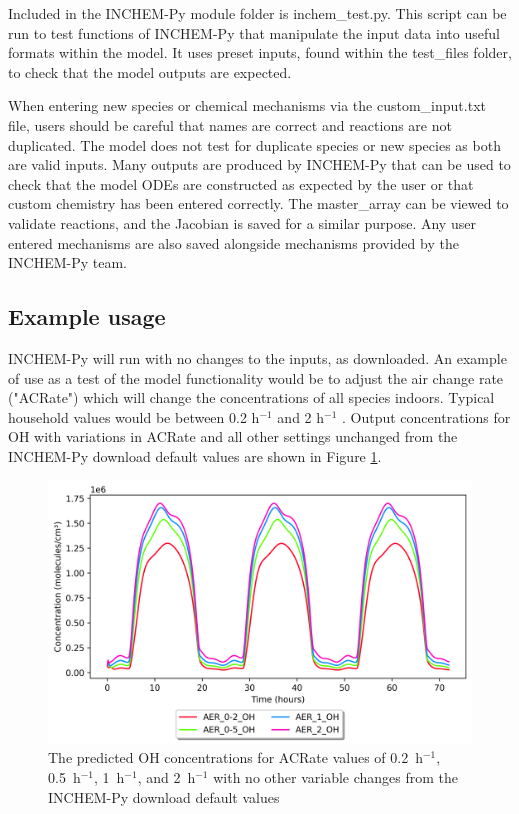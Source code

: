 \documentclass[a4paper]{refart}
\begin{document}
Included in the INCHEM-Py module folder is inchem\_test.py. This script can be run to test functions of INCHEM-Py that manipulate the input data into useful formats within the model. It uses preset inputs, found within the test\_files folder, to check that the model outputs are expected.

When entering new species or chemical mechanisms via the custom\_input.txt file, users should be careful that names are correct and reactions are not duplicated. The model does not test for duplicate species or new species as both are valid inputs. Many outputs are produced by INCHEM-Py that can be used to check that the model ODEs are constructed as expected by the user or that custom chemistry has been entered correctly. The master\_array can be viewed to validate reactions, and the Jacobian is saved for a similar purpose. Any user entered mechanisms are also saved alongside mechanisms provided by the INCHEM-Py team.

\subsection{Example usage}
INCHEM-Py will run with no changes to the inputs, as downloaded. An example of use as a test of the model functionality would be to adjust the air change rate ("ACRate") which will change the concentrations of all species indoors. Typical household values would be between 0.2 h$^{-1}$ and 2 h$^{-1}$ \cite{Weschler2000}.  Output concentrations for OH with variations in ACRate and all other settings unchanged from the INCHEM-Py download default values are shown in Figure \ref{fig:OH_AER}.
\begin{figure}[h]
    \centering
    \includegraphics[width=\textwidth]{OH_AER.png}
    \caption{The predicted OH concentrations for ACRate values of 0.2~h$^{-1}$, 0.5~h$^{-1}$, 1~h$^{-1}$, and 2~h$^{-1}$ with no other variable changes from the INCHEM-Py download default values}
    \label{fig:OH_AER}
\end{figure}
\end{document}

